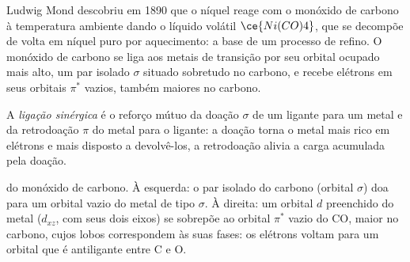 Ludwig Mond descobriu em 1890 que o níquel reage com o monóxido de carbono à temperatura
ambiente dando o líquido volátil $\ce{Ni(CO)4}$, que se decompõe de volta em níquel puro
por aquecimento: a base de um processo de refino. O monóxido de carbono se liga aos
metais de transição por seu orbital ocupado mais alto, um par isolado $\sigma$ situado sobretudo
no carbono, e recebe elétrons em seus orbitais $\pi^*$ vazios, também maiores no
carbono.

\begin{definition}\label{def:b3:organometallic-bonding:synergic}
A \emph{ligação sinérgica} é o reforço mútuo da
doação $\sigma$ de um ligante para um metal e da retrodoação $\pi$ do metal para o
ligante: a doação torna o metal mais rico em elétrons e mais disposto a devolvê-los,
a retrodoação alivia a carga acumulada pela doação.
\end{definition}

\begin{omfigure}

{\small {} do monóxido de carbono. À esquerda: o par isolado do carbono (orbital
$\sigma$) doa para um orbital vazio do metal de tipo $\sigma$. À direita: um orbital $d$ preenchido
do metal ($d_{xz}$, com seus dois eixos) se sobrepõe ao orbital $\pi^*$ vazio do CO, maior no
carbono, cujos lobos correspondem às suas fases: os elétrons voltam para um orbital que é
antiligante entre C e O.}
\end{omfigure}


